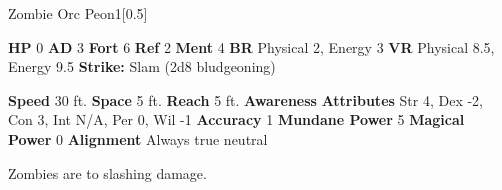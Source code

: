   \begin{monsubsection}{Zombie Orc Peon}{1}[0.5]
    \vspace{-1em}\vspace{-1em}
    \vspace{0em}

    
    

    \begin{spellcontent}
      \begin{spelltargetinginfo}
        \pari \textbf{HP} 0 \monsep
          \textbf{AD} 3 \monsep
          \textbf{Fort} 6 \monsep
          \textbf{Ref} 2 \monsep
          \textbf{Ment} 4
        \pari \textbf{BR} Physical 2, Energy 3 \monsep
        \textbf{VR} Physical 8.5, Energy 9.5
        \pari \textbf{Strike:}
            Slam  (2d8 bludgeoning)
      \end{spelltargetinginfo}
    \end{spellcontent}
    \begin{monsterfooter}
      \pari \textbf{Speed} 30 ft. \monsep
        \textbf{Space} 5 ft. \monsep
        \textbf{Reach} 5 ft.
      \pari \textbf{Awareness} 
      \pari \textbf{Attributes}
        Str 4, Dex -2,
        Con 3, Int N/A,
        Per 0, Wil -1
      \pari \textbf{Accuracy} 1 \monsep
        \textbf{Mundane Power} 5 \monsep
      \textbf{Magical Power} 0
      \pari \textbf{Alignment} Always true neutral
    \end{monsterfooter}
  \end{monsubsection}
          Zombies are  to slashing damage.
  

